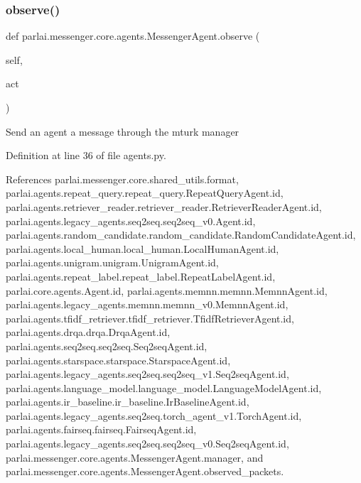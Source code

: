 \subsubsection{\texorpdfstring{observe()}{observe()}}
{\footnotesize\ttfamily def parlai.\+messenger.\+core.\+agents.\+Messenger\+Agent.\+observe (\begin{DoxyParamCaption}\item[{}]{self,  }\item[{}]{act }\end{DoxyParamCaption})}

\begin{DoxyVerb}Send an agent a message through the mturk manager\end{DoxyVerb}
 

Definition at line 36 of file agents.\+py.



References parlai.\+messenger.\+core.\+shared\+\_\+utils.\+format, parlai.\+agents.\+repeat\+\_\+query.\+repeat\+\_\+query.\+Repeat\+Query\+Agent.\+id, parlai.\+agents.\+retriever\+\_\+reader.\+retriever\+\_\+reader.\+Retriever\+Reader\+Agent.\+id, parlai.\+agents.\+legacy\+\_\+agents.\+seq2seq.\+seq2seq\+\_\+v0.\+Agent.\+id, parlai.\+agents.\+random\+\_\+candidate.\+random\+\_\+candidate.\+Random\+Candidate\+Agent.\+id, parlai.\+agents.\+local\+\_\+human.\+local\+\_\+human.\+Local\+Human\+Agent.\+id, parlai.\+agents.\+unigram.\+unigram.\+Unigram\+Agent.\+id, parlai.\+agents.\+repeat\+\_\+label.\+repeat\+\_\+label.\+Repeat\+Label\+Agent.\+id, parlai.\+core.\+agents.\+Agent.\+id, parlai.\+agents.\+memnn.\+memnn.\+Memnn\+Agent.\+id, parlai.\+agents.\+legacy\+\_\+agents.\+memnn.\+memnn\+\_\+v0.\+Memnn\+Agent.\+id, parlai.\+agents.\+tfidf\+\_\+retriever.\+tfidf\+\_\+retriever.\+Tfidf\+Retriever\+Agent.\+id, parlai.\+agents.\+drqa.\+drqa.\+Drqa\+Agent.\+id, parlai.\+agents.\+seq2seq.\+seq2seq.\+Seq2seq\+Agent.\+id, parlai.\+agents.\+starspace.\+starspace.\+Starspace\+Agent.\+id, parlai.\+agents.\+legacy\+\_\+agents.\+seq2seq.\+seq2seq\+\_\+v1.\+Seq2seq\+Agent.\+id, parlai.\+agents.\+language\+\_\+model.\+language\+\_\+model.\+Language\+Model\+Agent.\+id, parlai.\+agents.\+ir\+\_\+baseline.\+ir\+\_\+baseline.\+Ir\+Baseline\+Agent.\+id, parlai.\+agents.\+legacy\+\_\+agents.\+seq2seq.\+torch\+\_\+agent\+\_\+v1.\+Torch\+Agent.\+id, parlai.\+agents.\+fairseq.\+fairseq.\+Fairseq\+Agent.\+id, parlai.\+agents.\+legacy\+\_\+agents.\+seq2seq.\+seq2seq\+\_\+v0.\+Seq2seq\+Agent.\+id, parlai.\+messenger.\+core.\+agents.\+Messenger\+Agent.\+manager, and parlai.\+messenger.\+core.\+agents.\+Messenger\+Agent.\+observed\+\_\+packets.

